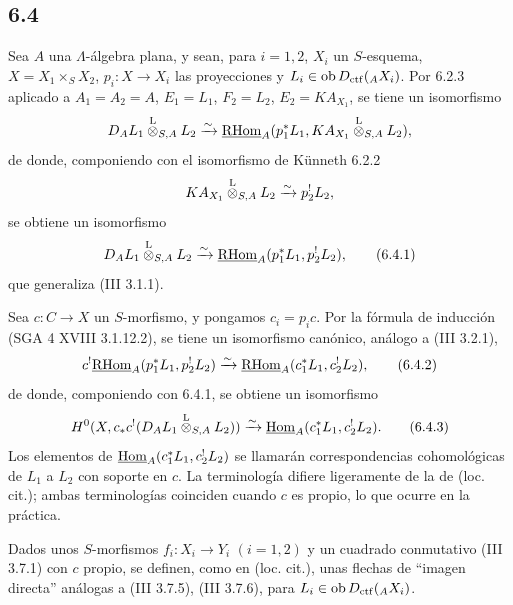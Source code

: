 \subsection*{6.4}
Sea $A$ una $\Lambda$-álgebra plana, y sean, para $i=1,2$, $X_i$ un $S$-esquema, $X=X_1\times_SX_2$, $p_i:X\to X_i$ las proyecciones y $L_i\in\operatorname{ob} D_{\mathrm{ctf}}({}_AX_i)$. Por 6.2.3 aplicado a $A_1=A_2=A$, $E_1=L_1$, $F_2=L_2$, $E_2=KA_{X_1}$, se tiene un isomorfismo
\[
D_A L_1\overset{\mathrm L}{\otimes}_{S,A}L_2
\xrightarrow{\sim}
\underline{\mathrm{RHom}}_A(p_1^*L_1,KA_{X_1}\overset{\mathrm L}{\otimes}_{S,A}L_2),
\]
de donde, componiendo con el isomorfismo de Künneth 6.2.2
\[
KA_{X_1}\overset{\mathrm L}{\otimes}_{S,A}L_2\xrightarrow{\sim}p_2^!L_2,
\]
se obtiene un isomorfismo
\begin{equation}
D_AL_1\overset{\mathrm L}{\otimes}_{S,A}L_2
\xrightarrow{\sim}
\underline{\mathrm{RHom}}_A(p_1^*L_1,p_2^!L_2),
\tag{6.4.1}
\end{equation}
que generaliza (III 3.1.1).

Sea $c:C\to X$ un $S$-morfismo, y pongamos $c_i=p_ic$. Por la fórmula de inducción (SGA 4 XVIII 3.1.12.2), se tiene un isomorfismo canónico, análogo a (III 3.2.1),
\begin{equation}
c^!\underline{\mathrm{RHom}}_A(p_1^*L_1,p_2^!L_2)
\xrightarrow{\sim}
\underline{\mathrm{RHom}}_A(c_1^*L_1,c_2^!L_2),
\tag{6.4.2}
\end{equation}
de donde, componiendo con 6.4.1, se obtiene un isomorfismo
\begin{equation}
H^0(X,c_*c^!(D_AL_1\overset{\mathrm L}{\otimes}_{S,A}L_2))
\xrightarrow{\sim}
\underline{\operatorname{Hom}}_A(c_1^*L_1,c_2^!L_2).
\tag{6.4.3}
\end{equation}
Los elementos de $\underline{\operatorname{Hom}}_A(c_1^*L_1,c_2^!L_2)$ se llamarán correspondencias cohomológicas de $L_1$ a $L_2$ con soporte en $c$. La terminología difiere ligeramente de la de (loc. cit.); ambas terminologías coinciden cuando $c$ es propio, lo que ocurre en la práctica.

Dados unos $S$-morfismos $f_i:X_i\to Y_i$ $(i=1,2)$ y un cuadrado conmutativo (III 3.7.1) con $c$ propio, se definen, como en (loc. cit.), unas flechas de ``imagen directa'' análogas a (III 3.7.5), (III 3.7.6), para $L_i\in\operatorname{ob} D_{\mathrm{ctf}}({}_AX_i)$.
